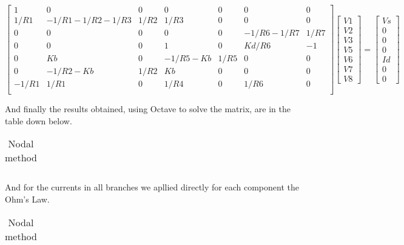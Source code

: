 $$
\begin{bmatrix} 
   1     & 0               & 0    & 0           & 0    & 0          & 0    \\
   1/R1  & -1/R1-1/R2-1/R3 & 1/R2 & 1/R3        & 0    & 0          & 0    \\
   0     & 0               & 0    & 0           & 0    & -1/R6-1/R7 & 1/R7 \\
   0     & 0               & 0    & 1           & 0    & Kd/R6      & -1   \\
   0     & Kb              & 0    & -1/R5-Kb    & 1/R5 & 0          & 0    \\
   0     & -1/R2-Kb        & 1/R2 & Kb          & 0    & 0          & 0    \\
   -1/R1 & 1/R1            & 0    & 1/R4        & 0    & 1/R6       & 0    \\
\end {bmatrix} 
\begin{bmatrix}
V1 \\ V2 \\ V3 \\ V5 \\ V6 \\ V7 \\ V8
\end {bmatrix} 
=
\begin{bmatrix} 
Vs \\ 0 \\ 0 \\ 0 \\ Id \\ 0 \\ 0
\end {bmatrix} 
$$ 


\vspace{0.5cm}
And finally the results obtained, using Octave to solve the matrix, are in the table down below. 


\FloatBarrier
\begin{table}[h]
  \centering
  \begin{tabular}{|c|c|c|c|c|c|c|}
    \hline    
    
    \hline
  \end{tabular}
  \caption{Nodal method}
  \label{tab:nodal}
\end{table}
\FloatBarrier 

And for the currents in all branches we apllied directly for each component the Ohm's Law. 

\FloatBarrier
\begin{table}[h]
  \centering
  \begin{tabular}{|c|c|c|c|c|c|c|}
    \hline    
    
    \hline
  \end{tabular}
  \caption{Nodal method}
  \label{tab:nodal}
\end{table}
\FloatBarrier 


